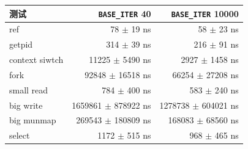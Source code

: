 \begin{tabular}{@{}lrr@{}}
\toprule
测试 & \texttt{BASE\_ITER} 40 & \texttt{BASE\_ITER} 10000 \\
\midrule
ref & 78 $\pm$ 19 ns & 58 $\pm$ 23 ns \\
getpid & 314 $\pm$ 39 ns & 216 $\pm$ 91 ns \\
context siwtch & 11225 $\pm$ 5490 ns & 2927 $\pm$ 1458 ns \\
fork & 92848 $\pm$ 16518 ns & 66254 $\pm$ 27208 ns \\
small read & 784 $\pm$ 400 ns & 583 $\pm$ 240 ns \\
big write & 1659861 $\pm$ 878922 ns & 1278738 $\pm$ 604021 ns \\
big munmap & 269543 $\pm$ 180809 ns & 168083 $\pm$ 68560 ns \\
select & 1172 $\pm$ 515 ns & 968 $\pm$ 465 ns \\
\bottomrule
\end{tabular}
